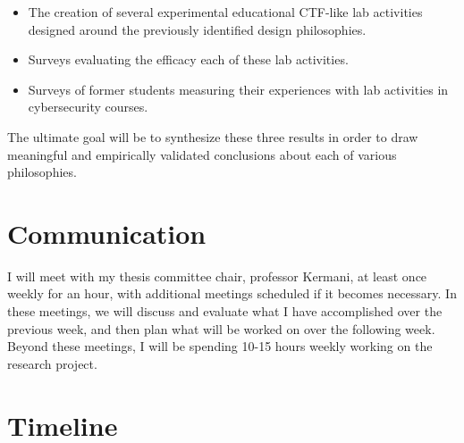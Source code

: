 \documentclass{article}
\begin{document}
    \begin{itemize}
        \item The creation of several experimental educational CTF-like lab activities designed around the previously identified design philosophies. 
        \item Surveys evaluating the efficacy each of these lab activities.\
        \item Surveys of former students measuring their experiences with lab activities in cybersecurity courses. 
    \end{itemize}

    The ultimate goal will be to synthesize these three results in order to draw meaningful and empirically validated conclusions about each of various philosophies.
    
    
\section{Communication}

    I will meet with my thesis committee chair, professor Kermani, at least once weekly for an hour, with additional meetings scheduled if it becomes necessary. 
    In these meetings, we will discuss and evaluate what I have accomplished over the previous week, and then plan what will be worked on over the following week. 
    Beyond these meetings, I will be spending 10-15 hours weekly working on the research project. %
     
\section{Timeline}

    
\end{document}
